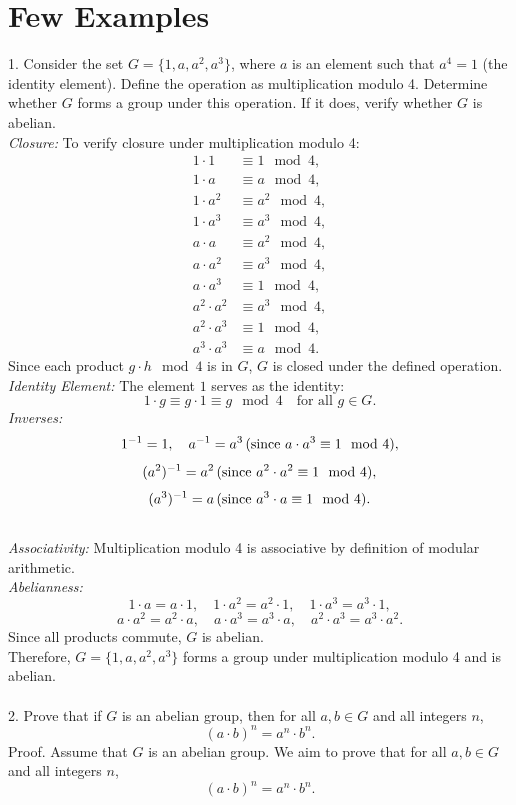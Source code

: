 \section{Few Examples}
1. Consider the set \( G = \{ 1, a, a^2, a^3 \} \), where \( a \) is an element such that \( a^4 = 1 \) (the identity element). Define the operation as multiplication modulo 4. Determine whether \( G \) forms a group under this operation. If it does, verify whether \( G \) is abelian.
\\
\textit{Closure:} To verify closure under multiplication modulo 4:
\begin{align*}
    1 \cdot 1 &\equiv 1 \mod 4, \\
    1 \cdot a &\equiv a \mod 4, \\
    1 \cdot a^2 &\equiv a^2 \mod 4, \\
    1 \cdot a^3 &\equiv a^3 \mod 4, \\
    a \cdot a &\equiv a^2 \mod 4, \\
    a \cdot a^2 &\equiv a^3 \mod 4, \\
    a \cdot a^3 &\equiv 1 \mod 4, \\
    a^2 \cdot a^2 &\equiv a^3 \mod 4, \\
    a^2 \cdot a^3 &\equiv 1 \mod 4, \\
    a^3 \cdot a^3 &\equiv a \mod 4.
\end{align*}
Since each product \( g \cdot h \mod 4 \) is in \( G \), \( G \) is closed under the defined operation.\\
\textit{Identity Element:}
The element \( 1 \) serves as the identity:
\[ 1 \cdot g \equiv g \cdot 1 \equiv g \mod 4 \quad \text{for all } g \in G. \]
\textit{Inverses:}
\[ 1^{-1} = 1, \quad a^{-1} = a^3 \, \text{(since \( a \cdot a^3 \equiv 1 \mod 4 \))}, \]
\[ (a^2)^{-1} = a^2 \, \text{(since \( a^2 \cdot a^2 \equiv 1 \mod 4 \))}, \]
\[ (a^3)^{-1} = a \, \text{(since \( a^3 \cdot a \equiv 1 \mod 4 \))}. \]
\\
\textit{Associativity:}
Multiplication modulo 4 is associative by definition of modular arithmetic.
\\
\textit{Abelianness:}
\[ 1 \cdot a = a \cdot 1, \quad 1 \cdot a^2 = a^2 \cdot 1, \quad 1 \cdot a^3 = a^3 \cdot 1, \]
\[ a \cdot a^2 = a^2 \cdot a, \quad a \cdot a^3 = a^3 \cdot a, \quad a^2 \cdot a^3 = a^3 \cdot a^2. \]
Since all products commute, \( G \) is abelian.
\\
Therefore, \( G = \{ 1, a, a^2, a^3 \} \) forms a group under multiplication modulo 4 and is abelian.\\
\\
2. Prove that if \( G \) is an abelian group, then for all \( a, b \in G \) and all integers \( n \),
\[ (a \cdot b)^n = a^n \cdot b^n. \]
{Proof.}
Assume that \( G \) is an abelian group. We aim to prove that for all \( a, b \in G \) and all integers \( n \),
\[ (a \cdot b)^n = a^n \cdot b^n. \]

